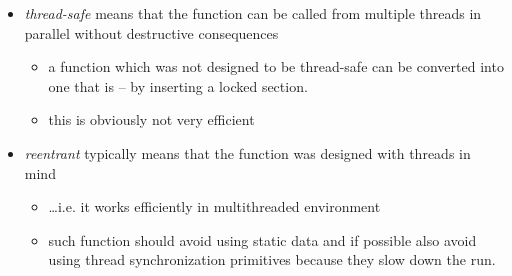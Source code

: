 \begin{slide}

\begin{itemize}
\item \emph{thread-safe} means that the function can be called from multiple
threads in parallel without destructive consequences
\begin{itemize}
\item a function which was not designed to be thread-safe can be
converted into one that is -- by inserting a locked section.
\item this is obviously not very efficient
\end{itemize}
\item \emph{reentrant} typically means that the function was designed
with threads in mind
\begin{itemize}
\item \dots{}i.e. it works efficiently in multithreaded environment
\item such function should avoid using static data and if possible also
avoid using thread synchronization primitives because they slow down 
the run.
\end{itemize}
\end{itemize}
\end{slide}


